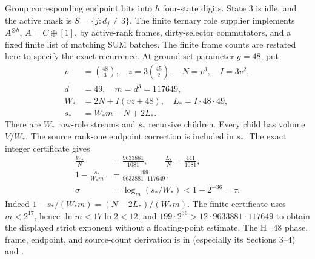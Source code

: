 Group corresponding endpoint bits into $h$ four-state digits.  State $3$
is idle, and the active mask is
$S=\{j:d_j\ne3\}$.  The finite ternary role supplier implements
$A^{\otimes h}$, $A=C\oplus[1]$, by active-rank frames, dirty-selector
commutators, and a fixed finite list of matching SUM batches.  The finite
frame counts are restated here to specify the exact recurrence.  At
ground-set parameter $g=48$, put
\[
\begin{aligned}
 v&=\binom{48}{3},\quad z=3\binom{45}{2},\quad N=v^3,\quad I=3v^2,\\
 d&=49,\quad m=d^3=117649,\\
 W_*&=2N+I(vz+48),\quad L_*=I\cdot48\cdot49,\\
 s_*&=W_*m-N+2L_*.
\end{aligned}
\]
There are $W_*$ row-role streams and $s_*$ recursive children.  Every
child has volume $V/W_*$.  The source rank-one endpoint correction is
included in $s_*$.  The exact integer certificate gives
\[
\begin{aligned}
 \frac{W_*}{N}&=\frac{9633881}{1081},\qquad
 \frac{L_*}{N}=\frac{441}{1081},\\
 1-\frac{s_*}{W_*m}&=\frac{199}{9633881\cdot117649},\\
 \sigma&=\log_m(s_*/W_*)<1-2^{-36}=\tau.
\end{aligned}
\]
Indeed $1-s_*/(W_*m)=(N-2L_*)/(W_*m)$.  The finite certificate uses
$m<2^{17}$, hence $\ln m<17\ln2<12$, and
$199\cdot2^{36}>12\cdot9633881\cdot117649$ to obtain the displayed
strict exponent without a floating-point estimate.  The H=48 phase,
frame, endpoint, and source-count derivation is in
(especially its Sections 3--4) and
.

